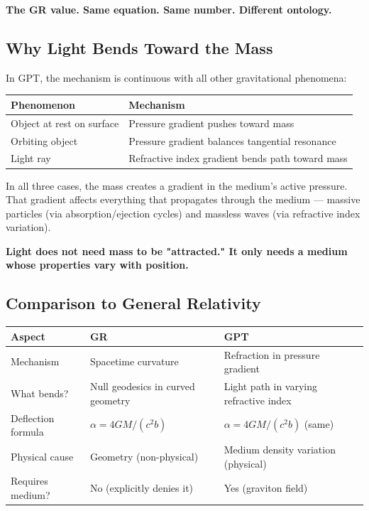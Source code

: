 \documentclass[12pt, a4paper]{article}
\begin{document}
\textbf{The GR value. Same equation. Same number. Different ontology.}

\subsection{Why Light Bends Toward the Mass}
\label{subsec:why_light_bends}

In GPT, the mechanism is continuous with all other gravitational phenomena:

\begin{center}
\begin{tabular}{|p{5cm}|p{9cm}|}
\hline
\textbf{Phenomenon} & \textbf{Mechanism} \\
\hline
Object at rest on surface & Pressure gradient pushes toward mass \\
\hline
Orbiting object & Pressure gradient balances tangential resonance \\
\hline
Light ray & Refractive index gradient bends path toward mass \\
\hline
\end{tabular}
\end{center}

In all three cases, the mass creates a gradient in the medium's active pressure. That gradient affects everything that propagates through the medium — massive particles (via absorption/ejection cycles) and massless waves (via refractive index variation).

\textbf{Light does not need mass to be "attracted." It only needs a medium whose properties vary with position.}

\subsection{Comparison to General Relativity}
\label{subsec:light_comparison}

\begin{center}
\begin{tabular}{|p{3.5cm}|p{5cm}|p{5cm}|}
\hline
\textbf{Aspect} & \textbf{GR} & \textbf{GPT} \\
\hline
Mechanism & Spacetime curvature & Refraction in pressure gradient \\
\hline
What bends? & Null geodesics in curved geometry & Light path in varying refractive index \\
\hline
Deflection formula & \( \alpha = 4GM/(c^2 b) \) & \( \alpha = 4GM/(c^2 b) \) (same) \\
\hline
Physical cause & Geometry (non-physical) & Medium density variation (physical) \\
\hline
Requires medium? & No (explicitly denies it) & Yes (graviton field) \\
\hline
\end{tabular}
\end{center}
\end{document}
